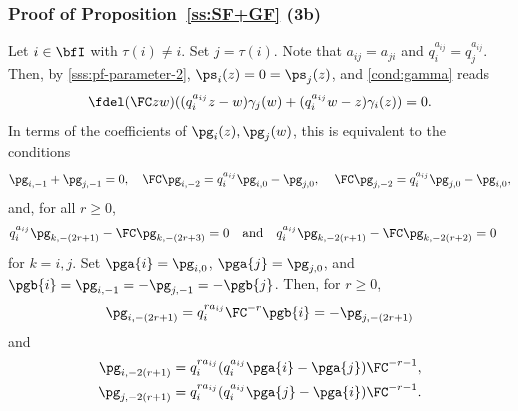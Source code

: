 \documentclass[reqno]{amsart}
\numberwithin{equation}{section}
\begin{document}
\subsubsection{Proof of Proposition~\ref{ss:SF+GF} (3b)}\label{sss:pf-parameter-3b}
Let $i\in\bfI$ with $\tau(i)\neq i$. Set $j=\tau(i)$. Note that $a_{ij}=a_{ji}$ and $q_i^{a_{ij}}=q_j^{a_{ij}}$. Then, by \ref{sss:pf-parameter-2}, $\ps_i(z)=0=\ps_j(z)$,
and \eqref{cond:gamma} reads
\begin{equation}
	\fdel(\FC zw)
	((q_i^{a_{ij}}z-w)\gamma_{j}(w)
	+(q_i^{a_{ij}}w-z)\gamma_i(z))=0.
\end{equation}
In terms of the coefficients of $\pg_i(z),\pg_j(w)$, this is equivalent to the conditions
\begin{equation}
	\pg_{i,-1}+\pg_{j,-1}=0,\quad
	\FC\pg_{i,-2}=q_i^{a_{ij}}\pg_{i,0}-\pg_{j,0},\,\quad
	\FC\pg_{j,-2}=q_i^{a_{ij}}\pg_{j,0}-\pg_{i,0},
\end{equation}
and, for all $r\geqslant0$,	
	\begin{equation}
	\begin{aligned}
		q_i^{a_{ij}}& \pg_{k, -(2r+1)}-\FC \pg_{k, -(2r+3)}=0
		\quad\mbox{and}\quad
		q_i^{a_{ij}}\pg_{k,-2(r+1)}-\FC \pg_{k,-2(r+2)}=0
	\end{aligned}	
\end{equation}
for $k=i,j$.
Set $\pga{i}=\pg_{i,0}$, $\pga{j}=\pg_{j,0}$, and $\pgb{i}=\pg_{i,-1}=-\pg_{j,-1}=-\pgb{j}$.
Then, for $r\geqslant0$,
\begin{equation}
\pg_{i,-(2r+1)}=q_i^{ra_{ij}}\FC^{-r}\pgb{i}=-\pg_{j,-(2r+1)}	
\end{equation}
and
\begin{equation}
\begin{aligned}
\pg_{i,-2(r+1)}=q_i^{ra_{ij}}(q_i^{a_{ij}}\pga{i}-\pga{j})\FC^{-r-1},\\
\pg_{j,-2(r+1)}=q_i^{ra_{ij}}(q_i^{a_{ij}}\pga{j}-\pga{i})\FC^{-r-1}.
\end{aligned}
\end{equation}
\end{document}
